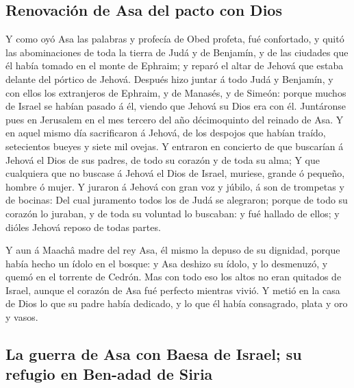 \hypertarget{renovaciuxf3n-de-asa-del-pacto-con-dios}{%
\subsection{Renovación de Asa del pacto con
Dios}\label{renovaciuxf3n-de-asa-del-pacto-con-dios}}

 Y como oyó Asa las palabras y profecía de Obed profeta,
fué confortado, y quitó las abominaciones de toda la tierra de Judá y de
Benjamín, y de las ciudades que él había tomado en el monte de Ephraim;
y reparó el altar de Jehová que estaba delante del pórtico de Jehová.
 Después hizo juntar á todo Judá y Benjamín, y con ellos
los extranjeros de Ephraim, y de Manasés, y de Simeón: porque muchos de
Israel se habían pasado á él, viendo que Jehová su Dios era con él.
 Juntáronse pues en Jerusalem en el mes tercero del año
décimoquinto del reinado de Asa.  Y en aquel mismo día
sacrificaron á Jehová, de los despojos que habían traído, setecientos
bueyes y siete mil ovejas.  Y entraron en concierto de
que buscarían á Jehová el Dios de sus padres, de todo su corazón y de
toda su alma;  Y que cualquiera que no buscase á Jehová
el Dios de Israel, muriese, grande ó pequeño, hombre ó mujer.
 Y juraron á Jehová con gran voz y júbilo, á son de
trompetas y de bocinas:  Del cual juramento todos los de
Judá se alegraron; porque de todo su corazón lo juraban, y de toda su
voluntad lo buscaban: y fué hallado de ellos; y dióles Jehová reposo de
todas partes.

 Y aun á Maachâ madre del rey Asa, él mismo la depuso de
su dignidad, porque había hecho un ídolo en el bosque: y Asa deshizo su
ídolo, y lo desmenuzó, y quemó en el torrente de Cedrón. 
Mas con todo eso los altos no eran quitados de Israel, aunque el corazón
de Asa fué perfecto mientras vivió.  Y metió en la casa
de Dios lo que su padre había dedicado, y lo que él había consagrado,
plata y oro y vasos.

\hypertarget{la-guerra-de-asa-con-baesa-de-israel-su-refugio-en-ben-adad-de-siria}{%
\subsection{La guerra de Asa con Baesa de Israel; su refugio en Ben-adad
de
Siria}\label{la-guerra-de-asa-con-baesa-de-israel-su-refugio-en-ben-adad-de-siria}}

